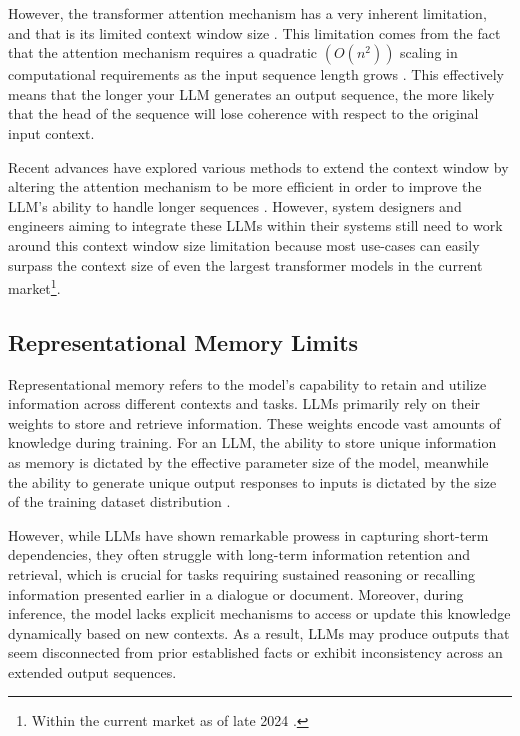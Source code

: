 However, the transformer attention mechanism has a very inherent limitation, and that is its limited context window size \cite{gongSelfAttentionLimitsWorking2024}. This limitation comes from the fact that the attention mechanism requires a quadratic \((O(n^2))\) scaling in computational requirements as the input sequence length grows \cite{vaswaniAttentionAllYou2023}. This effectively means that the longer your LLM generates an output sequence, the more likely that the head of the sequence will lose coherence with respect to the original input context.

Recent advances have explored various methods to extend the context window by altering the attention mechanism to be more efficient in order to improve the LLM's ability to handle longer sequences \cite{wangLimitsSurveyTechniques2024, almanFundamentalLimitationsSubquadratic2024}. However, system designers and engineers aiming to integrate these LLMs within their systems still need to work around this context window size limitation because most use-cases can easily surpass the context size of even the largest transformer models in the current market\footnote{Within the current market as of late 2024 \cite{minaeeLargeLanguageModels2024}.}. 

\subsection{Representational Memory Limits}

Representational memory refers to the model's capability to retain and utilize information across different contexts and tasks. LLMs primarily rely on their weights to store and retrieve information. These weights encode vast amounts of knowledge during training. For an LLM, the ability to store unique information as memory is dictated by the effective parameter size of the model, meanwhile the ability to generate unique output responses to inputs is dictated by the size of the training dataset distribution \cite{kaplanScalingLawsNeural2020}.

However, while LLMs have shown remarkable prowess in capturing short-term dependencies, they often struggle with long-term information retention and retrieval, which is crucial for tasks requiring sustained reasoning or recalling information presented earlier in a dialogue or document. Moreover, during inference, the model lacks explicit mechanisms to access or update this knowledge dynamically based on new contexts. As a result, LLMs may produce outputs that seem disconnected from prior established facts or exhibit inconsistency across an extended output sequences.


